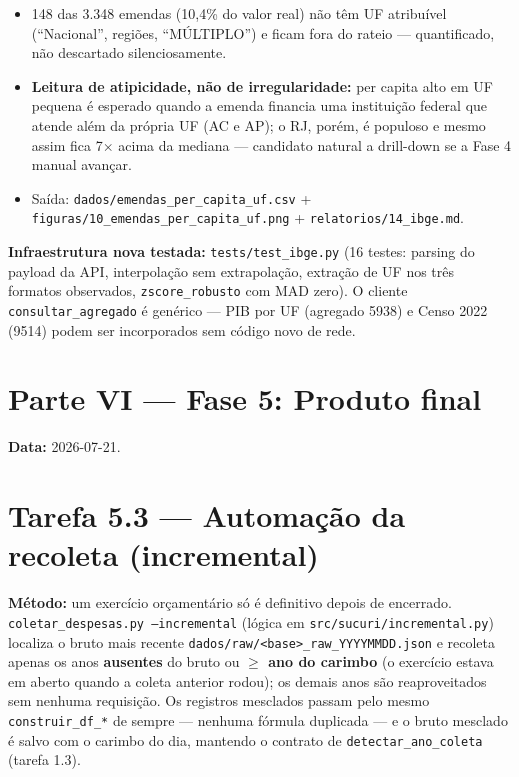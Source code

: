 \documentclass[11pt,a4paper]{article}
\begin{document}
\begin{itemize}
    \item 148 das 3.348 emendas (10,4\% do valor real) não têm UF
    atribuível (``Nacional'', regiões, ``MÚLTIPLO'') e ficam fora do
    rateio --- quantificado, não descartado silenciosamente.
    \item \textbf{Leitura de atipicidade, não de irregularidade:} per
    capita alto em UF pequena é esperado quando a emenda financia uma
    instituição federal que atende além da própria UF (AC e AP); o RJ,
    porém, é populoso e mesmo assim fica 7$\times$ acima da mediana ---
    candidato natural a drill-down se a Fase 4 manual avançar.
    \item Saída: \texttt{dados/emendas\_per\_capita\_uf.csv} +
    \texttt{figuras/10\_emendas\_per\_capita\_uf.png} +
    \texttt{relatorios/14\_ibge.md}.
\end{itemize}

\textbf{Infraestrutura nova testada:} \texttt{tests/test\_ibge.py} (16
testes: parsing do payload da API, interpolação sem extrapolação, extração
de UF nos três formatos observados, \texttt{zscore\_robusto} com MAD
zero). O cliente \texttt{consultar\_agregado} é genérico --- PIB por UF
(agregado 5938) e Censo 2022 (9514) podem ser incorporados sem código novo
de rede.

\clearpage
\section*{Parte VI --- Fase 5: Produto final}

\textbf{Data:} 2026-07-21.

\section{Tarefa 5.3 --- Automação da recoleta (incremental)}

\textbf{Método:} um exercício orçamentário só é definitivo depois de
encerrado. \texttt{coletar\_despesas.py --incremental} (lógica em
\texttt{src/sucuri/incremental.py}) localiza o bruto mais recente
\texttt{dados/raw/<base>\_raw\_YYYYMMDD.json} e recoleta apenas os anos
\textbf{ausentes} do bruto ou \textbf{$\geq$ ano do carimbo} (o exercício
estava em aberto quando a coleta anterior rodou); os demais anos são
reaproveitados sem nenhuma requisição. Os registros mesclados passam pelo
mesmo \texttt{construir\_df\_*} de sempre --- nenhuma fórmula duplicada
--- e o bruto mesclado é salvo com o carimbo do dia, mantendo o contrato
de \texttt{detectar\_ano\_coleta} (tarefa 1.3).
\end{document}
